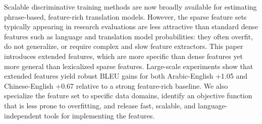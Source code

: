 Scalable discriminative training methods are now broadly available for estimating phrase-based, feature-rich translation models. However, the sparse feature sets typically appearing in research evaluations are less attractive than standard dense features such as language and translation model probabilities: they often overfit, do not generalize, or require complex and slow feature extractors. This paper introduces extended features, which are more specific than dense features yet more general than lexicalized sparse features. Large-scale experiments show that extended features yield robust BLEU gains for both Arabic-English +1.05 and Chinese-English +0.67 relative to a strong feature-rich baseline. We also specialize the feature set to specific data domains, identify an objective function that is less prone to overfitting, and release fast, scalable, and language-independent tools for implementing the features.
